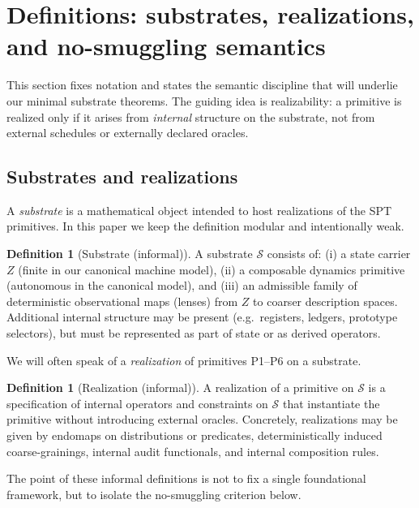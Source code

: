 \documentclass[11pt]{article}
\theoremstyle{definition}
\newtheorem{definition}[theorem]{Definition}
\theoremstyle{remark}
\begin{document}
 \section{Definitions: substrates, realizations, and no-smuggling semantics}
\label{sec:definitions}

This section fixes notation and states the semantic discipline that will underlie our minimal substrate theorems.
The guiding idea is realizability: a primitive is realized only if it arises from \emph{internal} structure on the substrate, not from external schedules or externally declared oracles.

\subsection{Substrates and realizations}
\label{sec:def-substrates}

A \emph{substrate} is a mathematical object intended to host realizations of the SPT primitives.
In this paper we keep the definition modular and intentionally weak.

\begin{definition}[Substrate (informal)]
\label{def:substrate}
A substrate $\mathcal S$ consists of:
(i) a state carrier $Z$ (finite in our canonical machine model),
(ii) a composable dynamics primitive (autonomous in the canonical model),
and (iii) an admissible family of deterministic observational maps (lenses) from $Z$ to coarser description spaces.
Additional internal structure may be present (e.g.\ registers, ledgers, prototype selectors), but must be represented as part of state or as derived operators.
\end{definition}

We will often speak of a \emph{realization} of primitives P1--P6 on a substrate.

\begin{definition}[Realization (informal)]
\label{def:realization}
A realization of a primitive on $\mathcal S$ is a specification of internal operators and constraints on $\mathcal S$ that instantiate the primitive without introducing external oracles.
Concretely, realizations may be given by endomaps on distributions or predicates, deterministically induced coarse-grainings, internal audit functionals, and internal composition rules.
\end{definition}

The point of these informal definitions is not to fix a single foundational framework, but to isolate the no-smuggling criterion below.
\end{document}
